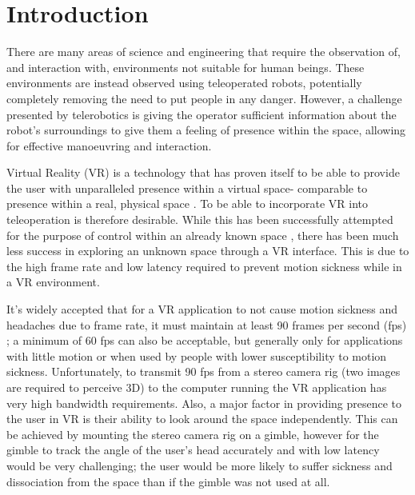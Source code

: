 \chapter{Introduction}

There are many areas of science and engineering that require the observation of, and interaction with, environments not suitable for human beings. These environments are instead observed using teleoperated robots, potentially completely removing the need to put people in any danger. However, a challenge presented by telerobotics is giving the operator sufficient information about the robot's surroundings to give them a feeling of presence \cite{presence} within the space, allowing for effective manoeuvring and interaction.

Virtual Reality (VR) is a technology that has proven itself to be able to provide the user with unparalleled presence within a virtual space- comparable to presence within a real, physical space \cite{loomis2016presence}. To be able to incorporate VR into teleoperation is therefore desirable. While this has been successfully attempted for the purpose of control within an already known space \cite{bounds2016integrated}, there has been much less success in exploring an unknown space through a VR interface. This is due to the high frame rate and low latency required to prevent motion sickness while in a VR environment.

It's widely accepted that for a VR application to not cause motion sickness and headaches due to frame rate, it must maintain at least 90 frames per second (fps) \cite{FrameRate}; a minimum of 60 fps can also be acceptable, but generally only for applications with little motion or when used by people with lower susceptibility to motion sickness. Unfortunately, to transmit 90 fps from a stereo camera rig (two images are required to perceive 3D) to the computer running the VR application has very high bandwidth requirements. Also, a major factor in providing presence to the user in VR is their ability to look around the space independently. This can be achieved by mounting the stereo camera rig on a gimble, however for the gimble to track the angle of the user's head accurately and with low latency would be very challenging; the user would be more likely to suffer sickness and dissociation from the space than if the gimble was not used at all.

